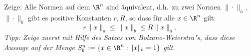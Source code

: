 \begin{prob} 
Zeige: Alle Normen auf dem $\R^n$ sind \"aquivalent, d.h.~zu zwei
Normen $\|\cdot \|_a$, $\|\cdot \|_b$ gibt es positive Konstanten $r,R$, so
dass f\"ur alle $x\in\R^n$ gilt:
$$
   r\|x\|_a\leq \|x\|_b\leq R\|x\|_a.
$$
{\em Tipp: Zeige zuerst mit Hilfe des Satzes von Bolzano-Weierstra"s, dass diese Aussage auf der Menge $S_b^n:=\{x\in\R^n:\|x\|_b=1\}$ gilt.}
\end{prob}
